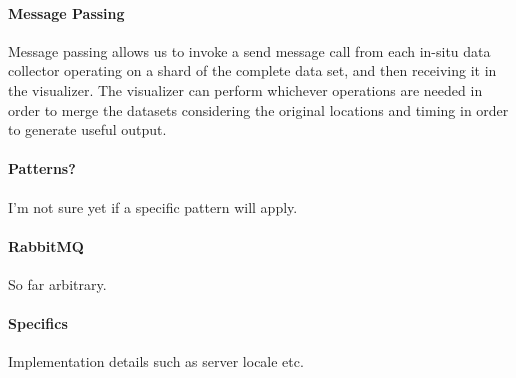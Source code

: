 \paragraph{Message Passing}
Message passing allows us to invoke a send message call from each in-situ data collector operating on a shard of the complete data set, and then receiving it in the visualizer. The visualizer can perform whichever operations are needed in order to merge the datasets considering the original locations and timing in order to generate useful output. 

\paragraph{Patterns?}
I'm not sure yet if a specific pattern will apply.

\paragraph{RabbitMQ}
So far arbitrary.

\paragraph{Specifics}
Implementation details such as server locale etc.

